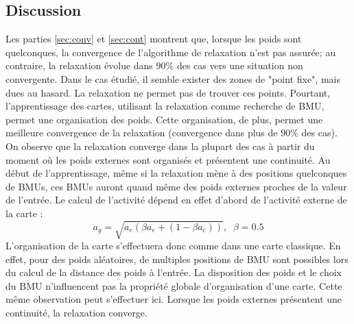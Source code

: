 \subsection{Discussion}
Les parties \ref{sec:conv} et \ref{sec:cont} montrent que, lorsque les poids sont quelconques, la convergence de l'algorithme de relaxation n'est pas assurée; au contraire, la relaxation évolue dans $90 \%$ des cas vers une situation non convergente. Dans le cas étudié, il semble exister des zones de "point fixe", mais dues au hasard. La relaxation ne permet pas de trouver ces points. Pourtant, l'apprentissage des cartes, utilisant la relaxation comme recherche de BMU, permet une organisation des poids. Cette organisation, de plus, permet une meilleure convergence de la relaxation (convergence dans plus de $90 \%$ des cas).
On observe que la relaxation converge dans la plupart des cas à partir du moment où les poids externes sont organisés et présentent une continuité. Au début de l'apprentissage, même si la relaxation mène à des positions quelconques de BMUs, ces BMUs auront quand même des poids externes proches de la valeur de l'entrée. Le calcul de l'activité dépend en effet d'abord de l'activité externe de la carte : 
$$ a_g = \sqrt{a_e ( \beta a_e + (1-\beta a_c))}, \;\; \beta=0.5$$ 
L'organisation de la carte s'effectuera donc comme dans une carte classique. En effet, pour des poids aléatoires, de multiples positions de BMU sont possibles lors du calcul de la distance des poids à l'entrée. La disposition des poids et le choix du BMU n'influencent pas la propriété globale d'organisation d'une carte. Cette même observation peut s'effectuer ici.
Lorsque les poids externes présentent une continuité, la relaxation converge. 

